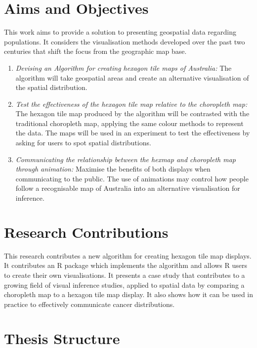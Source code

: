 \documentclass{monashthesis}
\begin{document}
\hypertarget{sec:aims}{%
\section{Aims and Objectives}\label{sec:aims}}

This work aims to provide a solution to presenting geospatial data regarding populations.
It considers the visualisation methods developed over the past two centuries that shift the focus from the geographic map base.

\begin{enumerate}
\def\labelenumi{\arabic{enumi}.}
\item
  \emph{Devising an Algorithm for creating hexagon tile maps of Australia:} The algorithm will take geospatial areas and create an alternative visualisation of the spatial distribution.
\item
  \emph{Test the effectiveness of the hexagon tile map relative to the choropleth map:} The hexagon tile map produced by the algorithm will be contrasted with the traditional choropleth map, applying the same colour methods to represent the data. The maps will be used in an experiment to test the effectiveness by asking for users to spot spatial distributions.
\item
  \emph{Communicating the relationship between the hexmap and choropleth map through animation:} Maximise the benefits of both displays when communicating to the public. The use of animations may control how people follow a recognisable map of Australia into an alternative visualisation for inference.
\end{enumerate}

\hypertarget{research-contributions}{%
\section{Research Contributions}\label{research-contributions}}

This research contributes a new algorithm for creating hexagon tile map displays. It contributes an R \autocite{R} package which implements the algorithm and allows R users to create their own visualisations.
It presents a case study that contributes to a growing field of visual inference studies, applied to spatial data by comparing a choropleth map to a hexagon tile map display.
It also shows how it can be used in practice to effectively communicate cancer distributions.

\hypertarget{thesis-structure}{%
\section{Thesis Structure}\label{thesis-structure}}
\end{document}
